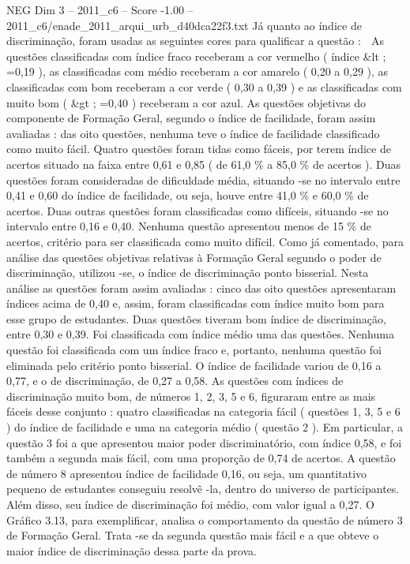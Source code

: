 \begin{textsample}{NEG Dim 3 – 2011\_c6 – Score -1.00 – 2011\_c6/enade\_2011\_arqui\_urb\_d40dca22f3.txt}
Já quanto ao índice de discriminação, foram usadas as seguintes cores para qualificar a questão :  As questões classificadas com índice fraco receberam a cor vermelho ( índice \&lt ; =0,19 ), as classificadas com médio receberam a cor amarelo ( 0,20 a 0,29 ), as classificadas com bom receberam a cor verde ( 0,30 a 0,39 ) e as classificadas com muito bom ( \&gt ; =0,40 ) receberam a cor azul.
As questões objetivas do componente de Formação Geral, segundo o índice de facilidade, foram assim avaliadas : das oito questões, nenhuma teve o índice de facilidade classificado como muito fácil.
Quatro questões foram tidas como fáceis, por terem índice de acertos situado na faixa entre 0,61 e 0,85 ( de 61,0 \% a 85,0 \% de acertos ).
Duas questões foram consideradas de dificuldade média, situando -se no intervalo entre 0,41 e 0,60 do índice de facilidade, ou seja, houve entre 41,0 \% e 60,0 \% de acertos.
Duas outras questões foram classificadas como difíceis, situando -se no intervalo entre 0,16 e 0,40.
Nenhuma questão apresentou menos de 15 \% de acertos, critério para ser classificada como muito difícil.
Como já comentado, para análise das questões objetivas relativas à Formação Geral segundo o poder de discriminação, utilizou -se, o índice de discriminação ponto bisserial.
Nesta análise as questões foram assim avaliadas : cinco das oito questões apresentaram índices acima de 0,40 e, assim, foram classificadas com índice muito bom para esse grupo de estudantes.
Duas questões tiveram bom índice de discriminação, entre 0,30 e 0,39.
Foi classificada com índice médio uma das questões.
Nenhuma questão foi classificada com um índice fraco e, portanto, nenhuma questão foi eliminada pelo critério ponto bisserial.
O índice de facilidade variou de 0,16 a 0,77, e o de discriminação, de 0,27 a 0,58.
As questões com índices de discriminação muito bom, de números 1, 2, 3, 5 e 6, figuraram entre as mais fáceis desse conjunto : quatro classificadas na categoria fácil ( questões 1, 3, 5 e 6 ) do índice de facilidade e uma na categoria médio ( questão 2 ).
Em particular, a questão 3 foi a que apresentou maior poder discriminatório, com índice 0,58, e foi também a segunda mais fácil, com uma proporção de 0,74 de acertos.
A questão de número 8 apresentou índice de facilidade 0,16, ou seja, um quantitativo pequeno de estudantes conseguiu resolvê -la, dentro do universo de participantes.
Além disso, seu índice de discriminação foi médio, com valor igual a 0,27.
O Gráfico 3.13, para exemplificar, analisa o comportamento da questão de número 3 de Formação Geral.
Trata -se da segunda questão mais fácil e a que obteve o maior índice de discriminação dessa parte da prova.

\end{textsample}
